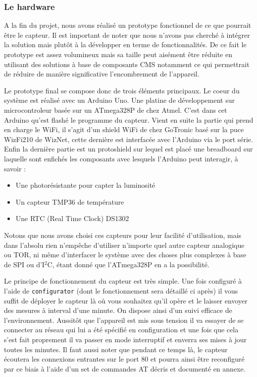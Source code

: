 		\subsubsection{Le hardware}
		\par
		A la fin du projet, nous avons réalisé un prototype fonctionnel de ce
		que pourrait être le capteur. Il est important de noter que nous n'avons
		pas cherché à intégrer la solution mais plutôt à la développer en terme
		de fonctionnalités. De ce fait le prototype est assez volumineux mais
		sa taille peut aisément être réduite en utilisant des solutions à base
		de composants CMS notamment ce qui permettrait de réduire de manière
		significative l'encombrement de l'appareil.
		\par
		Le prototype final se compose donc de trois éléments principaux. Le coeur
		du système est réalisé avec un Arduino Uno. Une platine de développement
		sur microcontroleur basée sur un ATmega328P de chez Atmel. C'est dans cet
		Arduino qu'est flashé le programme du capteur. Vient en suite la partie
		qui prend en charge le WiFi, il s'agit d'un shield WiFi de chez GoTronic
		basé sur la puce WizFi210 de WizNet, cette dernière est interfacée avec
		l'Arduino via le port série. Enfin la dernière partie est un protoshield
		sur lequel est placé une breadboard sur laquelle sont enfichés les composants
		avec lesquels l'Arduino peut interagir, à savoir :
		\begin{itemize}
			\item Une photorésistante pour capter la luminosité
			\item Un capteur TMP36 de température
			\item Une RTC (Real Time Clock) DS1302
		\end{itemize}
		Notons que nous avons choisi ces capteurs pour leur facilité d'utilisation,
		mais dans l'absolu rien n'empêche d'utiliser n'importe quel autre capteur
		analogique ou TOR, ni même d'interfacer le système avec des choses plus
		complexes à base de SPI ou d'I$^2$C, étant donné que l'ATmega328P en a
		la possibilité.
		\par
		Le principe de fonctionnement du capteur est très simple. Une fois configuré
		à l'aide de \texttt{configurator} (dont le fonctionnement sera détaillé ci après)
		il vous suffit de déployer le capteur là où vous souhaitez qu'il opère et le
		laisser envoyer des mesures à interval d'une minute. On dispose ainsi
		d'un suivi efficace de l'environnement. Aussitôt que l'appareil est
		mis sous tension il va essayer de se connecter au réseau qui lui a été
		spécifié en configuration et une fois que cela s'est fait proprement il
		va passer en mode interruptif et enverra ses mises à jour toutes les minutes.
		Il faut aussi noter que pendant ce temps là, le capteur écoutera les connexions
		entrantes sur le port 80 et pourra ainsi être reconfiguré par ce biais à l'aide
		d'un set de commandes AT décris et documenté en annexe.
		
